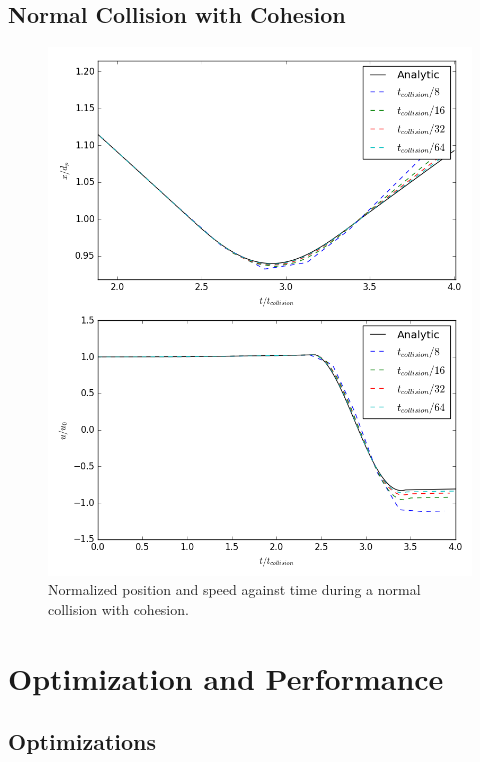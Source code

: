 \documentclass[10pt,a4paper,titlepage]{report}
\begin{document}
\subsection{Normal Collision with Cohesion}
\begin{figure}[!htb]
\centering
\includegraphics[scale=0.5]{figures/opencl_verification/cohesion_verification.png}
\caption{Normalized position and speed against time during a normal collision with cohesion.}
\label{fig:opencl_cohesion_verification}
\end{figure}
\section{Optimization and Performance}
\subsection{Optimizations}
\end{document}
